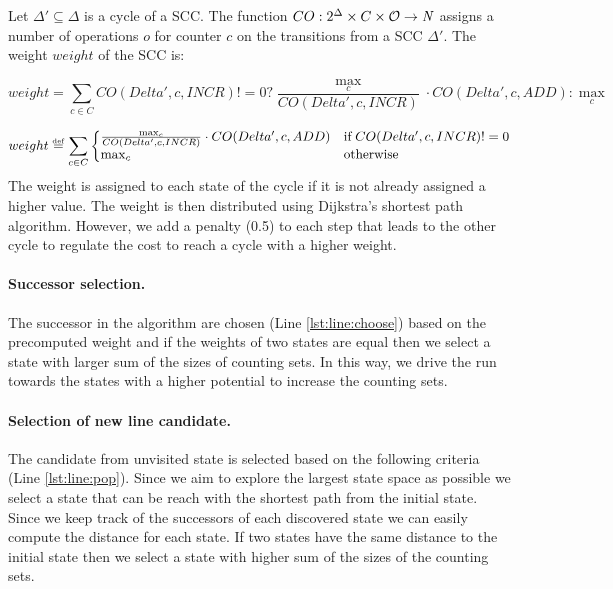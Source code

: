 \documentclass[acmsmall,screen]{acmart}
\begin{document}
%
Let $\Delta'\subseteq \Delta$ is a cycle of a SCC.
%
The function $CO: 2^{\Delta} \times C \times \mathcal{O} \rightarrow \mathit{N}$ assigns a number of operations $o$ for counter $c$ on the transitions from a SCC $\Delta'$.
%
The weight $weight$ of the SCC is: 

$$weight = \sum_{c\in C}CO(Delta',c,INCR) != 0  ? \frac{\max_c}{CO(Delta',c,INCR)} \cdot CO(Delta',c,ADD) : {\max_c}$$

%
$$
    weight \eqdef  \sum_{c\in C}
      \BraceIfThenElse{CO(Delta',c,INCR) != 0}{\frac{\max_c}{CO(Delta',c,INCR)} \cdot CO(Delta',c,ADD)} {\max_c}
$$
%
The weight is assigned to each state of the cycle if it is not already assigned a higher value. 
%
The weight is then distributed using Dijkstra’s shortest path algorithm.
%
However, we add a penalty (0.5) to each step that leads to the other cycle to regulate the cost to reach a cycle with a higher weight.

\paragraph{Successor selection.}
The successor in the algorithm are chosen (Line \ref{lst:line:choose}) based on the precomputed weight and if the weights of two states are equal then we select a state with larger sum of the sizes of counting sets. 
%
In this way, we drive the run towards the states with a higher potential to increase the counting sets.

\paragraph{Selection of new line candidate.}
The candidate from unvisited state is selected based on the following criteria (Line \ref{lst:line:pop}). 
%
Since we aim to explore the largest state space as possible 
%
we select a state that can be reach with the shortest path from the initial state.
%
Since we keep track of the successors of each discovered state we can easily compute the distance for each state.
%
If two states have the same distance to the initial state then we select a state with higher sum of the sizes of the counting sets. 
\end{document}
